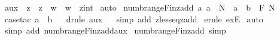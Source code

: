 \begin{isabellebody}
\isamarkupfalse%
%
\endisatagproof
{\isafoldproof}%
%
\isadelimproof
\isanewline
%
\endisadelimproof
\isanewline
\isanewline
{}\isamarkupfalse%
\ aux{\isacharcolon}\ \ {\isachardoublequoteopen}{\isacharbang}{\isacharbang}z{\isachardot}\ {\isachartilde}\ z\ {\isacharless}{\isacharequal}\ w\ {\isacharequal}{\isacharequal}{\isachargreater}\ w\ {\isacharless}\ {\isacharparenleft}z{\isacharcolon}{\isacharcolon}int{\isacharparenright}{\isachardoublequoteclose}\isanewline
%
\isadelimproof
%
\endisadelimproof
%
\isatagproof
{}\isamarkupfalse%
\ auto\isanewline
{}\isamarkupfalse%
%
\endisatagproof
{\isafoldproof}%
%
\isadelimproof
\isanewline
%
\endisadelimproof
\isanewline
\isanewline
{}\isamarkupfalse%
\ numb{\isacharunderscore}range{\isacharunderscore}Fin{\isacharunderscore}zadd{\isacharcolon}\ {\isachardoublequoteopen}{\isacharbang}{\isacharbang}a{\isachardot}\ {\isacharbrackleft}{\isacharbar}a\ {\isacharcolon}\ {\isacharpercent}N{\isacharbar}{\isacharbrackright}\ {\isacharequal}{\isacharequal}{\isachargreater}\ {\isacharparenleft}a\ {\isachardot}{\isachardot}\ b{\isacharparenright}\ {\isacharcolon}\ {\isacharpercent}F\ {\isacharpercent}N{\isachardoublequoteclose}\isanewline
%
\isadelimproof
%
\endisadelimproof
%
\isatagproof
{}\isamarkupfalse%
\ {\isacharparenleft}case{\isacharunderscore}tac\ {\isachardoublequoteopen}a\ {\isacharless}{\isacharequal}\ b{\isachardoublequoteclose}{\isacharparenright}\isanewline
{}\isamarkupfalse%
\ {}\isanewline
{}\isamarkupfalse%
\ {\isacharparenleft}drule\ aux{\isacharparenright}\isanewline
{}\isamarkupfalse%
\ {}\isanewline
{}\isamarkupfalse%
\ {\isacharparenleft}simp\ add{\isacharcolon}\ zless{\isacharunderscore}eq{\isacharunderscore}zadd{\isacharparenright}\isanewline
{}\isamarkupfalse%
\ {\isacharparenleft}erule\ exE{\isacharparenright}\isanewline
{}\isamarkupfalse%
\ auto\isanewline
{}\isamarkupfalse%
\ {\isacharparenleft}simp\ add{\isacharcolon}\ numb{\isacharunderscore}range{\isacharunderscore}Fin{\isacharunderscore}zadd{\isacharunderscore}aux{\isacharparenright}\isanewline
{}\isamarkupfalse%
%
\endisatagproof
{\isafoldproof}%
%
\isadelimproof
\isanewline
%
\endisadelimproof
{}\isamarkupfalse%
\ numb{\isacharunderscore}range{\isacharunderscore}Fin{\isacharunderscore}zadd\ {\isacharbrackleft}simp{\isacharbrackright}\isanewline
\isanewline
\isanewline
{}\isamarkupfalse%

\end{isabellebody}
